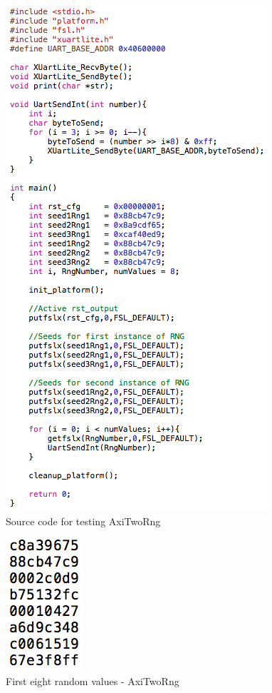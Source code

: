 \begin{figure}[!h]
\includegraphics[scale=0.75]{images/axiTwoRngSwCode.png}
\caption{Source code for testing AxiTwoRng}
\label{f12}
\end{figure}

\begin{figure}[!h]
\includegraphics[scale=0.5]{images/twoRngVal.png}
\caption{First eight random values - AxiTwoRng}
\label{f13}
\end{figure}
